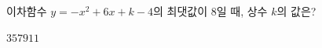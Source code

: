 \hspace*{2mm}\begin{minipage}[t]{\dimexpr\linewidth-2mm\relax}\vspace{0pt}
이차함수 $y=-x^2+6x+k-4$의 최댓값이 $8$일 때, 상수 $k$의 값은?
\begin{choices32}{$3$}{$5$}{$7$}{$9$}{$11$}\end{choices32}\end{minipage}
